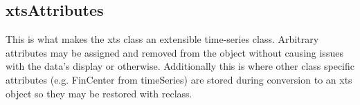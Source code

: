 \subsection{xtsAttributes}
This is what makes the xts class an extensible time-series class. Arbitrary attributes
may be assigned and removed from the object without causing issues
with the data’s display or otherwise. Additionally this is where other class specific
attributes (e.g. FinCenter from timeSeries) are stored during conversion
to an xts object so they may be restored with reclass.
